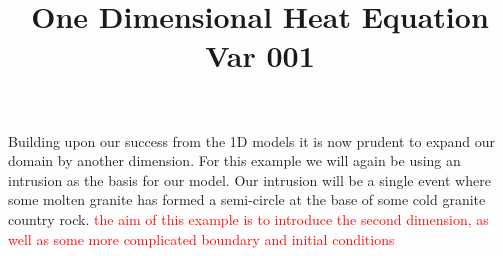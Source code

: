 \documentclass{manual}
\title{One Dimensional Heat Equation Var 001}
\newcommand{\editor}[1] {\textcolor{red}{#1}}
\begin{document}
 Building upon our success from the 1D models it is now prudent to expand our domain by another dimension. For this example we will again be using an intrusion as the basis for our model. Our intrusion will be a single event where some molten granite has formed a semi-circle at the base of some cold granite country rock. \editor{the aim of this example is to introduce the second dimension, as well as some more complicated boundary and initial conditions }
\end{document}
